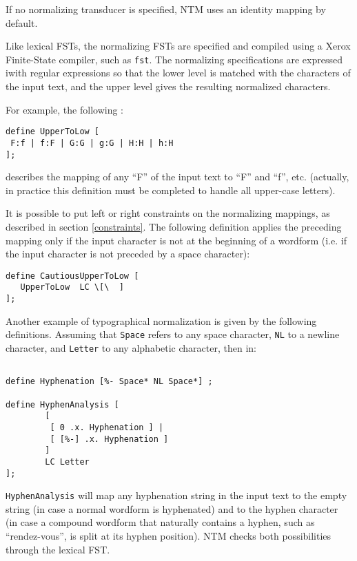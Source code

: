 \documentclass{article}
\newcommand{\scode}[1]{{\tt #1}}
\newcommand{\tool}[1]{{\tt #1}}
\begin{document}
If no normalizing transducer is specified, NTM uses an identity mapping by default.

Like lexical FSTs, the normalizing FSTs are specified and compiled using a Xerox Finite-State compiler, such as \tool{fst}. The normalizing specifications are expressed iwith regular expressions so that the lower level is matched with the characters of the input text, and the upper level gives the resulting normalized characters.

For example, the following :

\begin{verbatim}
define UpperToLow [
 F:f | f:F | G:G | g:G | H:H | h:H
];
\end{verbatim}

describes the mapping of any ``F'' of the input text to ``F'' and ``f'', etc. (actually, in practice this definition must be completed to handle all upper-case letters).


It is possible to put left or right constraints on the normalizing mappings, as described in section \ref{constraints}. The following definition applies the preceding mapping only if the input character is not at the beginning of a wordform (i.e. if the input character is not preceded by a space character):

\begin{verbatim}
define CautiousUpperToLow [
   UpperToLow  LC \[\  ]
];
\end{verbatim}


Another example of typographical normalization is given by the following definitions. Assuming that \scode{Space} refers to any space character, \scode{NL} to a newline character, and \scode{Letter} to any alphabetic character, then in: 


\begin{verbatim}

define Hyphenation [%- Space* NL Space*] ;

define HyphenAnalysis [
        [
         [ 0 .x. Hyphenation ] |
         [ [%-] .x. Hyphenation ]
        ]
        LC Letter
];

\end{verbatim}


\scode{HyphenAnalysis} will map any hyphenation string in the input text to the empty string (in case a normal wordform is hyphenated) and to the hyphen character (in case a compound wordform that naturally contains a hyphen, such as ``rendez-vous'', is split at its hyphen position). NTM checks both possibilities through the lexical FST.
\end{document}
